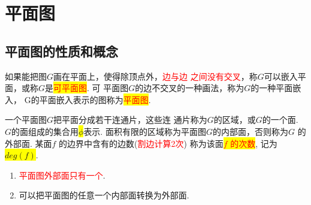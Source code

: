 \section{平面图}
\subsection{平面图的性质和概念}
\begin{definition}
如果能把图$G$画在平面上，使得除顶点外，\textcolor{red}{边与边
之间没有交叉}，称$G$可以嵌入平面，或称$G$是\colorbox{yellow}{\textcolor{red}{可平面图}}. 可
平面图$G$的边不交叉的一种画法，称为$G$的一种平面嵌入，
G的平面嵌入表示的图称为\colorbox{yellow}{\textcolor{red}{平面图}}.
\end{definition}

\begin{definition}
一个平面图$G$把平面分成若干连通片，这些连
通片称为$G$的区域，或$G$的一个面. $G$的面组成的集合用\colorbox{yellow}{$\phi$}表示. 面积有限的区域称为平面图$G$的内部面，否则称为$G$
的外部面. 某面$f$ 的边界中含有的边数(\textcolor{red}{割边计算2次})
称为该面\colorbox{yellow}{\textcolor{red}{$f$ 的次数}}, 记为\colorbox{yellow}{$deg (f)$}.
\end{definition}
\begin{note}
	\begin{enumerate}
		\item \textcolor{red}{平面图外部面只有一个}.
		\item 可以把平面图的任意一个内部面转换为外部面.
	\end{enumerate}
	
\end{note}

